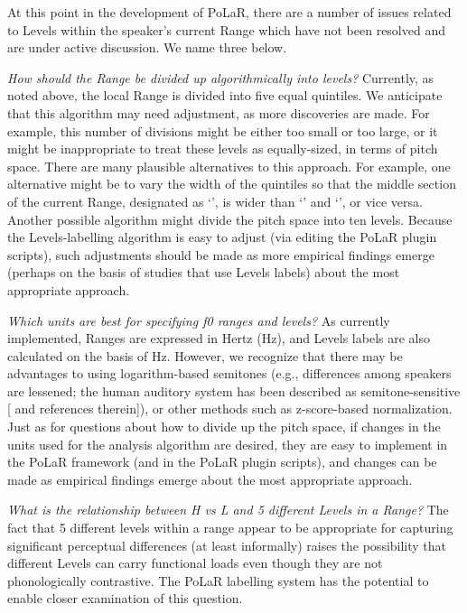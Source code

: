 \documentclass[11pt, twoside]{memoir}
\def\textlabel#1{{\relsize{-.5}\fontspec[Mapping=tex-text]{Roboto Mono}{#1}}}
\begin{document}
At this point in the development of PoLaR, there are a number of issues related to Levels within the speaker’s current Range which have not been resolved and are under active discussion.  We name three below.

\textit{How should the Range be divided up algorithmically into levels?} Currently, as noted above, the local Range is divided into five equal quintiles. We anticipate that this algorithm may need adjustment, as more discoveries are made. For example, this number of divisions might be either too small or too large, or it might be inappropriate to treat these levels as equally-sized, in terms of pitch space. There are many plausible alternatives to this approach. For example, one alternative might be to vary the width of the quintiles so that the middle section of the current Range, designated as ‘\textlabel{3}’, is wider than ‘\textlabel{1}’ and ‘\textlabel{5}’, or vice versa. Another possible algorithm might divide the pitch space into ten levels. Because the Levels-labelling algorithm is easy to adjust (via editing the PoLaR plugin scripts), such adjustments should be made as more empirical findings emerge (perhaps on the basis of studies that use Levels labels) about the most appropriate approach.

\textit{Which units are best for specifying f0 ranges and levels?} As currently implemented, Ranges are expressed in Hertz (Hz), and Levels labels are also calculated on the basis of Hz. However, we recognize that there may be advantages to using logarithm-based semitones (e.g., differences among speakers are lessened; the human auditory system has been described as semitone-sensitive [\citealt{nolan03} and references therein]), or other methods such as z-score-based normalization. Just as for questions about how to divide up the pitch space, if changes in the units used for the analysis algorithm are desired, they are easy to implement in the PoLaR framework (and in the PoLaR plugin scripts), and changes can be made as empirical findings emerge about the most appropriate approach.

\textit{What is the relationship between H vs L and 5 different Levels in a Range?}  The fact that 5 different levels within a range appear to be appropriate for capturing significant perceptual differences (at least informally) raises the possibility that different Levels can carry functional loads even though they are not phonologically contrastive.  The PoLaR labelling system has the potential to enable closer examination of this question.
\end{document}
